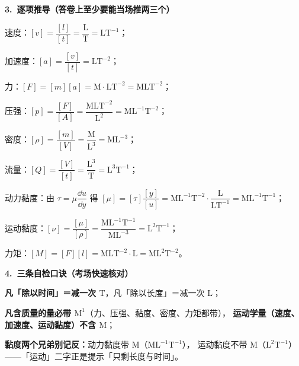 \begin{jie}
\textbf{3.\ 逐项推导（答卷上至少要能当场推两三个）}
\begin{xiaowen}
\item 速度：$[v]=\dfrac{[l]}{[t]}=\dfrac{\mathrm{L}}{\mathrm{T}}=\mathrm{LT^{-1}}$；
\item 加速度：$[a]=\dfrac{[v]}{[t]}=\mathrm{LT^{-2}}$；
\item 力：$[F]=[m][a]=\mathrm{M}\cdot\mathrm{LT^{-2}}=\mathrm{MLT^{-2}}$；
\item 压强：$[p]=\dfrac{[F]}{[A]}=\dfrac{\mathrm{MLT^{-2}}}{\mathrm{L^{2}}}=\mathrm{ML^{-1}T^{-2}}$；
\item 密度：$[\rho]=\dfrac{[m]}{[V]}=\dfrac{\mathrm{M}}{\mathrm{L^{3}}}=\mathrm{ML^{-3}}$；
\item 流量：$[Q]=\dfrac{[V]}{[t]}=\dfrac{\mathrm{L^{3}}}{\mathrm{T}}=\mathrm{L^{3}T^{-1}}$；
\item 动力黏度：由 $\tau=\mu\dfrac{\dd u}{\dd y}$ 得
$[\mu]=[\tau]\dfrac{[y]}{[u]}=\mathrm{ML^{-1}T^{-2}}\cdot\dfrac{\mathrm{L}}{\mathrm{LT^{-1}}}
=\mathrm{ML^{-1}T^{-1}}$；
\item 运动黏度：$[\nu]=\dfrac{[\mu]}{[\rho]}=\dfrac{\mathrm{ML^{-1}T^{-1}}}{\mathrm{ML^{-3}}}
=\mathrm{L^{2}T^{-1}}$；
\item 力矩：$[M]=[F][l]=\mathrm{MLT^{-2}}\cdot\mathrm{L}=\mathrm{ML^{2}T^{-2}}$。
\end{xiaowen}

\textbf{4.\ 三条自检口诀（考场快速核对）}
\begin{xiaowen}
\item \textbf{凡「除以时间」＝减一次 $\mathrm{T}$}，凡「除以长度」＝减一次 $\mathrm{L}$；
\item \textbf{凡含质量的量必带 $\mathrm{M^{1}}$}（力、压强、黏度、密度、力矩都带），
\textbf{运动学量（速度、加速度、运动黏度）不含 $\mathrm{M}$}；
\item \textbf{黏度两个兄弟别记反：}动力黏度带 $\mathrm{M}$（$\mathrm{ML^{-1}T^{-1}}$），
运动黏度不带 $\mathrm{M}$（$\mathrm{L^{2}T^{-1}}$）——「运动」二字正是提示「只剩长度与时间」。
\end{xiaowen}
\end{jie}

